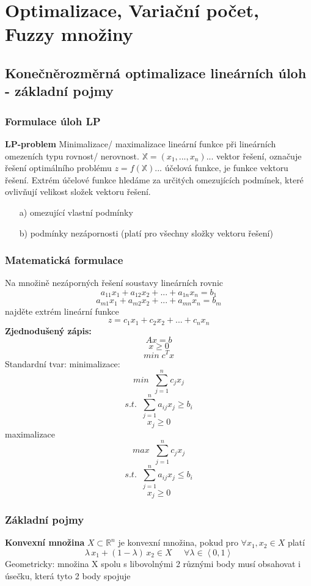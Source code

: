 
\chapter{Optimalizace, Variační počet, Fuzzy množiny}

\section{Konečněrozměrná optimalizace lineárních úloh - základní pojmy}

\subsection{Formulace úloh LP}
\textbf{LP-problem}
Minimalizace/ maximalizace lineární funkce při lineárních omezeních typu rovnost/ nerovnost.
\newline $\mathbb{X}=(x_{1},...,x_{n})$... vektor řešení, označuje řešení optimálního problému
\newline $z=f(\mathbb{X})$... účelová funkce, je funkce vektoru řešení. Extrém účelové funkce hledáme za určitých omezujících podmínek, které ovlivňují velikost složek vektoru řešení.
\begin{enumerate}
\item[a)] omezující vlastní podmínky
\item[b)] podmínky nezápornosti (platí pro všechny složky vektoru řešení)
\end{enumerate}

\subsection{Matematická formulace}
Na množině nezáporných řešení soustavy lineárních rovnic 
$$ a_{11}x_{1}+a_{12}x_{2}+...+a_{1n}x_{n}=b_{1}$$
$$a_{m1}x_{1}+a_{m2}x_{2}+...+a_{mn}x_{n}=b_{m}$$
najděte extrém lineární funkce
$$z=c_{1}x_{1}+c_{2}x_{2}+...+c_{n}x_{n}$$
\textbf{Zjednodušený zápis:}
$$Ax=b$$
$$x\geq 0$$
$$min\; c^{T}x$$
Standardní tvar:
minimalizace:
$$min\; \; \sum_{j=1}^{n}c_{j}x_{j}$$
$$ s.t. \; \; \sum_{j=1}^{n}a_{ij}x_{j}\geq b_{i}$$
$$ x_{j}\geq 0 $$
maximalizace
$$max\; \; \sum_{j=1}^{n}c_{j}x_{j}$$
$$ s.t. \; \; \sum_{j=1}^{n}a_{ij}x_{j}\leq b_{i}$$
$$ x_{j}\geq 0 $$

\subsection{Základní pojmy}

\textbf{Konvexní množina}
$X\subset \mathbb{R}^{n}$ je konvexní množina, pokud pro $\forall x_{1},x_{2}\in X$ platí
$$\lambda \, x_{1}+(1-\lambda )\, x_{2}\in X\; \; \; \; \; \forall \lambda \in \left \langle 0,1 \right \rangle$$
Geometricky: množina X spolu s libovolnými 2 různými body musí obsahovat i úsečku, která tyto 2 body spojuje

